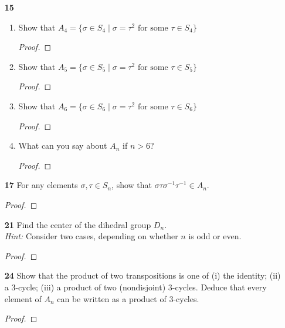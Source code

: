\documentclass[paper=usletter, fontsize=12pt]{article}
\begin{document}
\begin{itemize}
\begin{itemize}
            \item[\textbf{15}]
            \begin{enumerate}[label=\textbf{(\alph*)}]

                \item Show that $A_4=\{\sigma \in S_4 \mid \sigma = \tau^2
                \text{ for some } \tau \in S_4\}$
                \begin{proof}
                \end{proof}

                \item Show that $A_5=\{\sigma \in S_5 \mid \sigma = \tau^2
                \text{ for some } \tau \in S_5\}$
                \begin{proof}
                \end{proof}

                \item Show that $A_6=\{\sigma \in S_6 \mid \sigma = \tau^2
                \text{ for some } \tau \in S_6\}$
                \begin{proof}
                \end{proof}

                \item What can you say about $A_n$ if $n>6$?
                \begin{proof}
                \end{proof}

            \end{enumerate}

            \item[\textbf{17}] For any elements $\sigma, \tau \in S_n$, show
            that $\sigma\tau\sigma^{-1}\tau^{-1}\in A_n$.
            \begin{proof}
            \end{proof}

            \item[\textbf{21}] Find the center of the dihedral group $D_n$. \\
            \textit{Hint:} Consider two cases, depending on whether $n$ is odd
            or even.
            \begin{proof}
            \end{proof}

            \item[\textbf{24}] Show that the product of two transpositions is
            one of (i) the identity; (ii) a 3-cycle; (iii) a product of two
            (nondisjoint) 3-cycles. Deduce that every element of $A_n$ can be
            written as a product of 3-cycles.
            \begin{proof}
            \end{proof}

        \end{itemize}

    \end{itemize}
\end{document}
